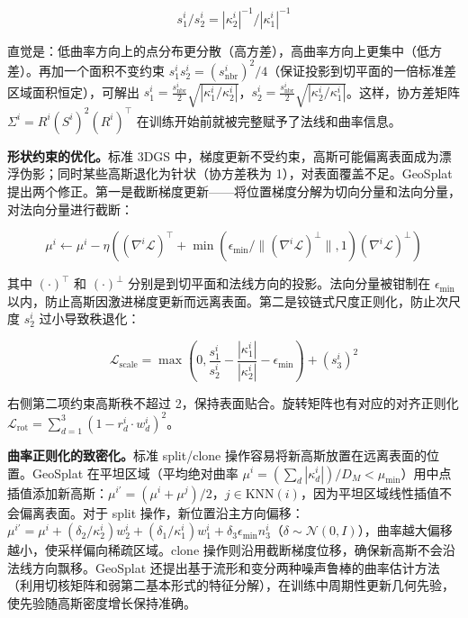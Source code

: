 \begin{equation}
    s^i_1 / s^i_2 = |\kappa_2^i|^{-1} / |\kappa_1^i|^{-1}
\end{equation}

直觉是：低曲率方向上的点分布更分散（高方差），高曲率方向上更集中（低方差）。再加一个面积不变约束 $s^i_1 s^i_2 = (s^i_{\text{nbr}})^2 / 4$（保证投影到切平面的一倍标准差区域面积恒定），可解出 $s^i_1 = \frac{s^i_{\text{nbr}}}{2}\sqrt{|\kappa_1^i / \kappa_2^i|}$，$s^i_2 = \frac{s^i_{\text{nbr}}}{2}\sqrt{|\kappa_2^i / \kappa_1^i|}$。这样，协方差矩阵 $\Sigma^i = R^i (S^i)^2 (R^i)^\top$ 在训练开始前就被完整赋予了法线和曲率信息。

\textbf{形状约束的优化。}标准 3DGS 中，梯度更新不受约束，高斯可能偏离表面成为漂浮伪影；同时某些高斯退化为针状（协方差秩为 1），对表面覆盖不足。GeoSplat 提出两个修正。第一是截断梯度更新——将位置梯度分解为切向分量和法向分量，对法向分量进行截断：

\begin{equation}
    \mu^i \leftarrow \mu^i - \eta\left((\nabla^i\mathcal{L})^\top + \min\left(\epsilon_{\min} / \|(\nabla^i\mathcal{L})^\perp\|, 1\right)(\nabla^i\mathcal{L})^\perp\right)
\end{equation}

其中 $(\cdot)^\top$ 和 $(\cdot)^\perp$ 分别是到切平面和法线方向的投影。法向分量被钳制在 $\epsilon_{\min}$ 以内，防止高斯因激进梯度更新而远离表面。第二是铰链式尺度正则化，防止次尺度 $s^i_2$ 过小导致秩退化：

\begin{equation}
    \mathcal{L}_{\text{scale}} = \max\left(0, \frac{s^i_1}{s^i_2} - \frac{|\kappa_1^i|}{|\kappa_2^i|} - \epsilon_{\min}\right) + (s^i_3)^2
\end{equation}

右侧第二项约束高斯秩不超过 2，保持表面贴合。旋转矩阵也有对应的对齐正则化 $\mathcal{L}_{\text{rot}} = \sum_{d=1}^{3}(1 - r_d^i \cdot w^i_d)^2$。

\textbf{曲率正则化的致密化。}标准 split/clone 操作容易将新高斯放置在远离表面的位置。GeoSplat 在平坦区域（平均绝对曲率 $\mu^i = (\sum_d |\kappa_d^i|) / D_M < \mu_{\min}$）用中点插值添加新高斯：$\mu^{i'} = (\mu^i + \mu^j) / 2$，$j \in \text{KNN}(i)$，因为平坦区域线性插值不会偏离表面。对于 split 操作，新位置沿主方向偏移：$\mu^{i'} = \mu^i + (\delta_2 / \kappa_2^i) w^i_2 + (\delta_1 / \kappa_1^i) w^i_1 + \delta_3 \epsilon_{\min} n^i_3$（$\delta \sim \mathcal{N}(0, I)$），曲率越大偏移越小，使采样偏向稀疏区域。clone 操作则沿用截断梯度位移，确保新高斯不会沿法线方向飘移。GeoSplat 还提出基于流形和变分两种噪声鲁棒的曲率估计方法（利用切核矩阵和弱第二基本形式的特征分解），在训练中周期性更新几何先验，使先验随高斯密度增长保持准确。

